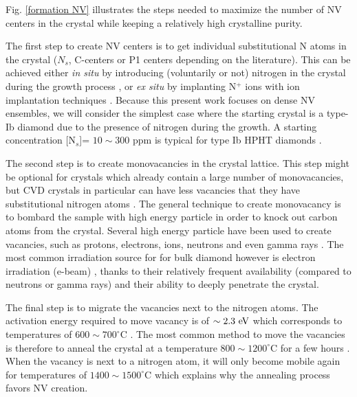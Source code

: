 \documentclass[a4paper,11pt]{report}
\begin{document}
\begin{refsection}
Fig. \ref{formation NV} illustrates the steps needed to maximize the number of NV centers in the crystal while keeping a relatively high crystalline purity.

The first step to create NV centers is to get individual substitutional N atoms in the crystal ($N_s$, C-centers or P1 centers depending on the literature). This can be achieved either \textit{in situ} by introducing (voluntarily or not) nitrogen in the crystal during the growth process \citep{tallaire2006characterisation, lobaev2017influence}, or \textit{ex situ} by implanting N$^+$ ions with ion implantation techniques \citep{meijer2005generation, smith2019colour}. Because this present work focuses on dense NV ensembles, we will consider the simplest case where the starting crystal is a type-Ib diamond due to the presence of nitrogen during the growth. A starting concentration [N$_s$]= $10 \sim 300$ ppm is typical for type Ib HPHT diamonds \citep{achard2020chemical}.

The second step is to create monovacancies in the crystal lattice. This step might be optional for crystals which already contain a large number of monovacancies, but CVD crystals in particular can have less vacancies that they have substitutional nitrogen atoms \citep{mainwood1999point}. The general technique to create monovacancy is to bombard the sample with high energy particle in order to knock out carbon atoms from the crystal. Several high energy particle have been used to create vacancies, such as protons, electrons, ions, neutrons and even gamma rays \citep{davies1976optical, ashbaugh1988gemstone, kleinsasser2016high}. The most common irradiation source for for bulk diamond however is electron irradiation (e-beam) \citep{acosta2009diamonds}, thanks to their relatively frequent availability (compared to neutrons or gamma rays) and their ability to deeply penetrate the crystal.

The final step is to migrate the vacancies next to the nitrogen atoms. The activation energy required to move vacancy is of $\sim 2.3\ \rm eV$ which corresponds to temperatures of $600\sim 700 ^\circ$C \citep{davies1992vacancy, newton2002recombination}. The most common method to move the vacancies is therefore to anneal the crystal at a temperature $800 \sim 1200 ^\circ$C for a few hours \citep{botsoa2011optimal}. When the vacancy is next to a nitrogen atom, it will only become mobile again for temperatures of $1400 \sim 1500 ^\circ$C \citep{zaitsev2013optical, pinto2012diffusion} which explains why the annealing process favors NV creation.


\end{refsection}
\end{document}
